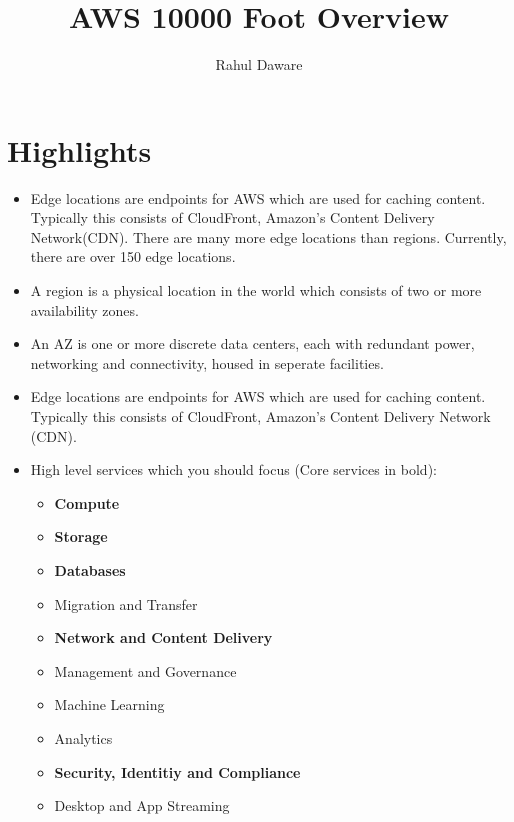\documentclass{article}
\author{Rahul Daware}
\begin{document}
\title{AWS 10000 Foot Overview}
\maketitle
\newpage
\tableofcontents
\newpage

\section{Highlights}
\begin{itemize}
\item
Edge locations are endpoints for AWS which are used for caching content. Typically this consists of CloudFront, Amazon's Content Delivery Network(CDN). There are many more edge locations than regions. Currently, there are over 150 edge locations.

\item
A region is a physical location in the world which consists of two or more availability zones.

\item
An AZ is one or more discrete data centers, each with redundant power, networking and connectivity, housed in seperate facilities.

\item
Edge locations are endpoints  for AWS which are used for caching content. Typically this consists of CloudFront, Amazon's Content Delivery Network (CDN).

\item
High level services which you should focus (Core services in bold): 
	\begin{itemize}
	
	\item
	\textbf{Compute}
	
	\item
	\textbf{Storage}
	
	\item
	\textbf{Databases}
	
	\item
	Migration and Transfer
	
	\item
	\textbf{Network and Content Delivery}
	
	\item
	Management and Governance
	
	\item
	Machine Learning
	
	\item
	Analytics
	
	\item
	\textbf{Security, Identitiy and Compliance}
	
	\item
	Desktop and App Streaming
	
	\end{itemize}
\end{itemize}
\end{document}
